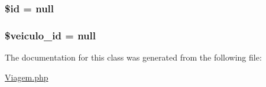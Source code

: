 \subsubsection[{\$id}]{\setlength{\rightskip}{0pt plus 5cm}\$id = null}\label{class_viagem_ae97941710d863131c700f069b109991e}
\hypertarget{class_viagem_aa09ccdf3684621b143afc4d242e8428b}{}
\subsubsection[{\$veiculo\+\_\+id}]{\setlength{\rightskip}{0pt plus 5cm}\$veiculo\+\_\+id = null}\label{class_viagem_aa09ccdf3684621b143afc4d242e8428b}


The documentation for this class was generated from the following file\+:\begin{DoxyCompactItemize}
\item 
\hyperlink{_viagem_8php}{Viagem.\+php}\end{DoxyCompactItemize}
